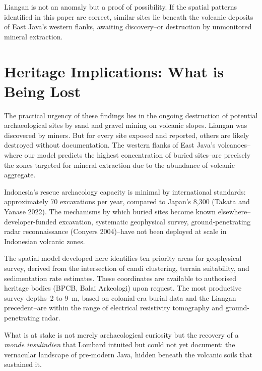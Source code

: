 \documentclass[12pt,a4paper]{article}
\begin{document}
Liangan is not an anomaly but a proof of possibility.
If the spatial patterns identified in this paper are correct, similar sites lie beneath the volcanic deposits of East Java's western flanks, awaiting discovery--or destruction by unmonitored mineral extraction.


\section{Heritage Implications: What is Being Lost}

The practical urgency of these findings lies in the ongoing destruction of potential archaeological sites by sand and gravel mining on volcanic slopes.
Liangan was discovered by miners.
But for every site exposed and reported, others are likely destroyed without documentation.
The western flanks of East Java's volcanoes--where our model predicts the highest concentration of buried sites--are precisely the zones targeted for mineral extraction due to the abundance of volcanic aggregate.

Indonesia's rescue archaeology capacity is minimal by international standards: approximately 70 excavations per year, compared to Japan's 8,300 (Takata and Yanase 2022).
The mechanisms by which buried sites become known elsewhere--developer-funded excavation, systematic geophysical survey, ground-penetrating radar reconnaissance (Conyers 2004)--have not been deployed at scale in Indonesian volcanic zones.

The spatial model developed here identifies ten priority areas for geophysical survey, derived from the intersection of candi clustering, terrain suitability, and sedimentation rate estimates.
These coordinates are available to authorised heritage bodies (BPCB, Balai Arkeologi) upon request.
The most productive survey depths--2 to 9~m, based on colonial-era burial data and the Liangan precedent--are within the range of electrical resistivity tomography and ground-penetrating radar.

What is at stake is not merely archaeological curiosity but the recovery of a \emph{monde insulindien} that Lombard intuited but could not yet document: the vernacular landscape of pre-modern Java, hidden beneath the volcanic soils that sustained it.
\end{document}
